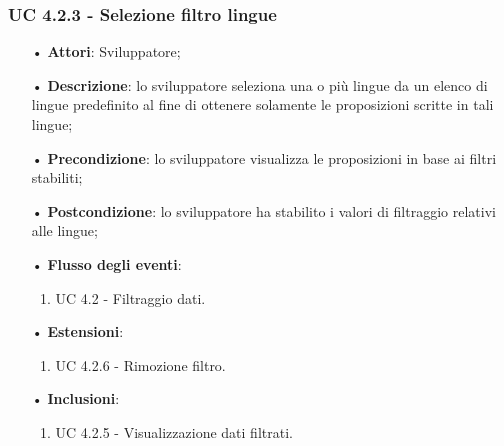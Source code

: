 \subsubsection{UC 4.2.3 -  Selezione filtro lingue}
\begin{itemize}
\item[•]\textbf{Attori}: Sviluppatore;
\item[•]\textbf{Descrizione}: lo sviluppatore seleziona una o più lingue da un elenco di lingue predefinito al fine di ottenere solamente le proposizioni scritte in tali lingue;
\item[•]\textbf{Precondizione}: lo sviluppatore visualizza le proposizioni in base ai filtri stabiliti;
\item[•]\textbf{Postcondizione}: lo sviluppatore ha stabilito i valori di filtraggio relativi alle lingue;
\item[•]\textbf{Flusso degli eventi}: 	
\begin{enumerate}
	\item UC 4.2 - Filtraggio dati.
\end{enumerate}
\item[•]\textbf{Estensioni}: 
\begin{enumerate}
	\item UC 4.2.6 - Rimozione filtro.
\end{enumerate}
\item[•]\textbf{Inclusioni}:
\begin{enumerate}
\item UC 4.2.5 - Visualizzazione dati filtrati.
\end{enumerate}
\end{itemize}

